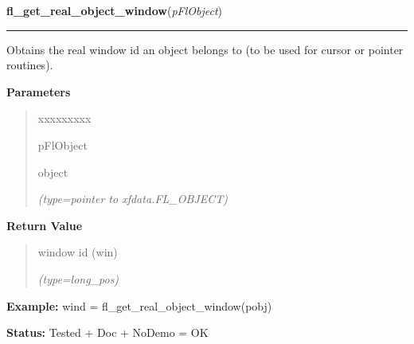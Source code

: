     \vspace{0.5ex}

\hspace{.8\funcindent}\begin{boxedminipage}{\funcwidth}

    \raggedright \textbf{fl\_get\_real\_object\_window}(\textit{pFlObject})

    \vspace{-1.5ex}

    \rule{\textwidth}{0.5\fboxrule}
\setlength{\parskip}{2ex}
    Obtains the real window id an object belongs to (to be used for cursor 
    or pointer routines).

\setlength{\parskip}{1ex}
      \textbf{Parameters}
      \vspace{-1ex}

      \begin{quote}
        \begin{Ventry}{xxxxxxxxx}

          \item[pFlObject]

          object

            {\it (type=pointer to xfdata.FL\_OBJECT)}

        \end{Ventry}

      \end{quote}

      \textbf{Return Value}
    \vspace{-1ex}

      \begin{quote}
      window id (win)

      {\it (type=long\_pos)}

      \end{quote}

\textbf{Example:} wind = fl\_get\_real\_object\_window(pobj)



\textbf{Status:} Tested + Doc + NoDemo = OK



    \end{boxedminipage}

    \label{xformslib:flxbasic:FL_ObjWin}

    \vspace{0.5ex}

